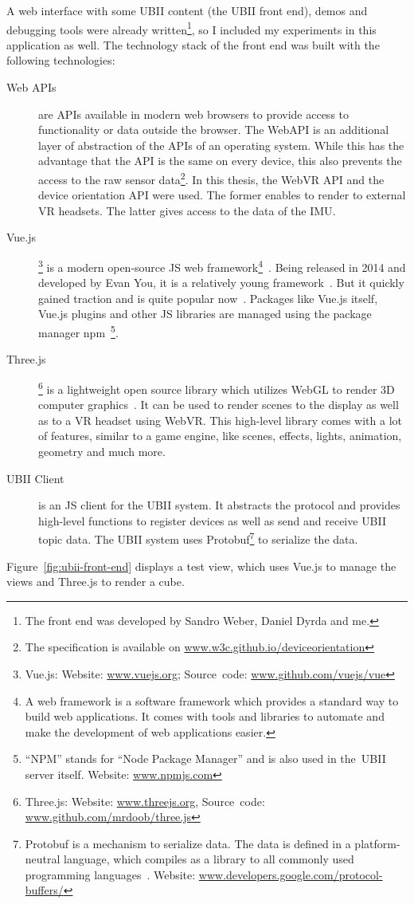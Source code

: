 A web interface with some \ac{UBII} content (the \ac{UBII} front end), demos and debugging tools were already written\footnote{The front end was developed by Sandro Weber, Daniel Dyrda and me.}, so I included my experiments in this application as well. The technology stack of the front end was built with the following technologies:
\begin{description}
  \item[Web APIs] are \acfp{API} available in modern web browsers to provide access to functionality or data outside the browser. The WebAPI is an additional layer of abstraction of the \acp{API} of an operating system. While this has the advantage that the API is the same on every device, this also prevents the access to the raw sensor data\footnote{The specification is available on \href{https://w3c.github.io/deviceorientation/}{www.w3c.github.io/deviceorientation}}. In this thesis, the WebVR \ac{API} and the device orientation \ac{API} were used. The former enables to render to external \ac{VR} headsets. The latter gives access to the data of the \acf{IMU}.
  \item[Vue.js]\footnote{Vue.js: Website: \href{https://vuejs.org/}{www.vuejs.org}; Source~code: \href{https://github.com/vuejs/vue}{www.github.com/vuejs/vue}} is a modern open-source \acl{JS} web framework\footnote{A web framework is a software framework which provides a standard way to build web applications. It comes with tools and libraries to automate and make the development of web applications easier.}~\cite{You.2019}. Being released in 2014 and developed by Evan You, it is a relatively young framework~\cite[17]{Koetsier.2016}. But it quickly gained traction and is quite popular now~\cite[12\psq]{Koetsier.2016}.
  Packages like Vue.js itself, Vue.js plugins and other \acl{JS} libraries are managed using the package manager npm~\footnote{\enquote{NPM} stands for \enquote{Node Package Manager} and is also used in the~\ac{UBII} server itself. Website: \href{https://www.npmjs.com/}{www.npmjs.com}}.
  \item[Three.js]\footnote{Three.js: Website: \href{https://threejs.org/}{www.threejs.org}, Source~code: \href{https://github.com/mrdoob/three.js/}{www.github.com/mrdoob/three.js}} is a lightweight open source library which utilizes WebGL to render \ac{3D} computer graphics~\cite{Cabello.2019}. It can be used to render scenes to the display as well as to a VR headset using WebVR. This high-level library comes with a lot of features, similar to a game engine, like scenes, effects, lights, animation, geometry and much more.
  \item[UBII Client] is an \acl{JS} client for the \ac{UBII} system. It abstracts the protocol and provides high-level functions to register devices as well as send and receive \ac{UBII} topic data. The UBII system uses \acf{Protobuf}\footnote{Protobuf is a mechanism to serialize data. The data is defined in a platform-neutral language, which compiles as a library to all commonly used programming languages~\cite{GoogleLLC.2019b}. Website: \href{https://developers.google.com/protocol-buffers/}{www.developers.google.com/protocol-buffers/}} to serialize the data.
\end{description}

Figure~\ref{fig:ubii-front-end} displays a test view, which uses Vue.js to manage the views and Three.js to render a cube.